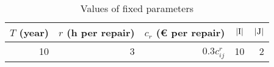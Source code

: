 \documentclass[preprint,12pt]{elsarticle}
\begin{document}
\normalsize


\begin{table}[htbp]
  \centering
  \caption{Values of fixed parameters}
    \begin{tabular}{rrrrr}
    \toprule
    $T$ (year) & $r$ (h per repair) & $c_{r}$ (€ per repair) & \(\lvert $I$ \rvert\)   & \(\lvert $J$\rvert\) \\
    \midrule
    10    & 3     & 0.3$c_{ij}^{r}$ & 10    & 2 \\
    \bottomrule
    \end{tabular}%
  \label{tab:addlabel}%
\end{table}%
\end{document}
